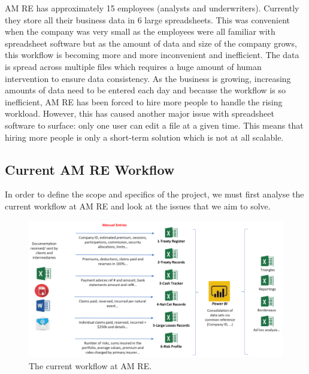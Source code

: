 \documentclass[12pt]{article}
\begin{document}
AM RE has approximately 15 employees (analysts and underwriters). Currently they store all their business data in 6 large spreadsheets. This was convenient when the company was very small as the employees were all familiar with spreadsheet software but as the amount of data and size of the company grows, this workflow is becoming more and more inconvenient and inefficient. The data is spread across multiple files which requires a huge amount of human intervention to ensure data consistency. As the business is growing, increasing amounts of data need to be entered each day and because the workflow is so inefficient, AM RE has been forced to hire more people to handle the rising workload. However, this has caused another major issue with spreadsheet software to surface: only one
user can edit a file at a given time. This means that hiring more people is only a short-term solution which is not at all scalable.

\subsection{Current AM RE Workflow}
In order to define the scope and specifics of the project, we must first analyse the current workflow at AM RE and look at the issues that we aim to solve.

\begin{figure}
    \includegraphics[width=\linewidth]{current_workflow.png}
    \caption{The current workflow at AM RE.}
    \label{fig:current_workflow}
\end{figure}
\end{document}
